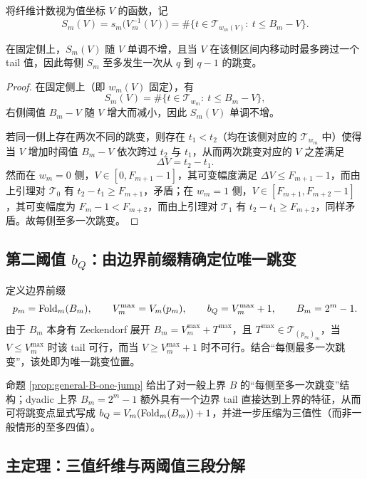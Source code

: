 将纤维计数视为值坐标 $V$ 的函数，记
$$
S_m(V)=s_m\big(V_m^{-1}(V)\big)
=\#\Big\{t\in\mathcal{T}_{w_m(V)}:\ t\le B_m-V\Big\}.
$$

\begin{corollary}[每侧最多一次跳变]
在固定侧上，$S_m(V)$ 随 $V$ 单调不增，且当 $V$ 在该侧区间内移动时最多跨过一个 tail 值，因此每侧 $S_m$ 至多发生一次从 $q$ 到 $q-1$ 的跳变。
\end{corollary}

\begin{proof}
在固定侧上（即 $w_m(V)$ 固定），有
$$
S_m(V)=\#\{t\in\mathcal{T}_{w_m}:\ t\le B_m-V\},
$$
右侧阈值 $B_m-V$ 随 $V$ 增大而减小，因此 $S_m(V)$ 单调不增。

若同一侧上存在两次不同的跳变，则存在 $t_1<t_2$（均在该侧对应的 $\mathcal{T}_{w_m}$ 中）使得当 $V$ 增加时阈值 $B_m-V$ 依次跨过 $t_2$ 与 $t_1$，从而两次跳变对应的 $V$ 之差满足
$$
\Delta V=t_2-t_1.
$$
然而在 $w_m=0$ 侧，$V\in[0,F_{m+1}-1]$，其可变幅度满足 $\Delta V\le F_{m+1}-1$，而由上引理对 $\mathcal{T}_0$ 有 $t_2-t_1\ge F_{m+1}$，矛盾；在 $w_m=1$ 侧，$V\in[F_{m+1},F_{m+2}-1]$，其可变幅度为 $F_m-1<F_{m+2}$，而由上引理对 $\mathcal{T}_1$ 有 $t_2-t_1\ge F_{m+2}$，同样矛盾。故每侧至多一次跳变。
\end{proof}

\subsection{第二阈值 \texorpdfstring{$b_Q$}{b\_Q}：由边界前缀精确定位唯一跳变}

定义边界前缀
$$
p_m=\mathrm{Fold}_m(B_m),\qquad V_m^{\max}=V_m(p_m),\qquad b_Q=V_m^{\max}+1,\qquad B_m=2^m-1.
$$
由于 $B_m$ 本身有 Zeckendorf 展开 $B_m=V_m^{\max}+T^{\max}$，且 $T^{\max}\in\mathcal{T}_{(p_m)_m}$，当 $V\le V_m^{\max}$ 时该 tail 可行，而当 $V\ge V_m^{\max}+1$ 时不可行。结合“每侧最多一次跳变”，该处即为唯一跳变位置。

\begin{remark}
命题 \ref{prop:general-B-one-jump} 给出了对一般上界 $B$ 的“每侧至多一次跳变”结构；dyadic 上界 $B_m=2^m-1$ 额外具有一个边界 tail 直接达到上界的特征，从而可将跳变点显式写成 $b_Q=V_m(\mathrm{Fold}_m(B_m))+1$，并进一步压缩为三值性（而非一般情形的至多四值）。
\end{remark}

\subsection{主定理：三值纤维与两阈值三段分解}

